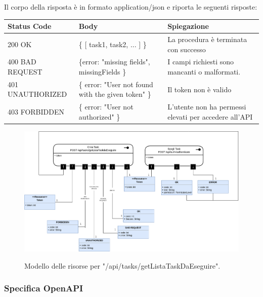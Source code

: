 \documentclass{report}
\begin{document}
Il corpo della risposta è in formato application/json e riporta le seguenti risposte:

\begin{center} %
	\centering
	\begin{tabular}{ |p{4cm}|p{4cm}|p{4cm}| }
		\hline
		\centering Status Code & \qquad\qquad\quad Body                             & \qquad\quad Spiegazione                               \\ %
		\hline
		200 OK                 & \{ [ task1, task2, ... ] \}                        & La procedura è terminata con successo                 \\
		\hline
		400 BAD REQUEST        & \{error: "missing fields", missingFields \}        & I campi richiesti sono mancanti o malformati.         \\
		\hline
		401 UNAUTHORIZED       & \{ error: "User not found with the given token" \} & Il token non è valido                                 \\
		\hline
		403 FORBIDDEN          & \{ error: "User not authorized" \}                 & L'utente non ha permessi elevati per accedere all'API \\
		\hline
	\end{tabular}
\end{center}

\begin{figure}[H]
	\centering\includegraphics[width=1\textwidth]{images/model_da_eseguire.png}

	Modello delle risorse per "/api/tasks/getListaTaskDaEseguire".
\end{figure}

\subsubsection*{Specifica OpenAPI}
\end{document}
